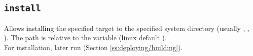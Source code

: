 \subsection{\texttt{install}}
\begin{center}  \end{center}
Allows installing the specified target to the specified system directory (usually , , ). The path is relative to the  variable (linux default ). \\
For installation, later run  (Section \ref{ss:deploying/building}).